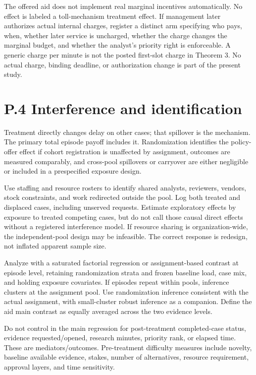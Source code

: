 \documentclass[
  11pt,
]{article}
\begin{document}
The offered aid does not implement real marginal incentives
automatically. No effect is labeled a toll-mechanism treatment effect.
If management later authorizes actual internal charges, register a
distinct arm specifying who pays, when, whether later service is
uncharged, whether the charge changes the marginal budget, and whether
the analyst's priority right is enforceable. A generic charge per minute
is not the posted first-slot charge in Theorem 3. No actual charge,
binding deadline, or authorization change is part of the present study.

\section{P.4 Interference and
identification}\label{p.4-interference-and-identification}

Treatment directly changes delay on other cases; that spillover is the
mechanism. The primary total episode payoff includes it. Randomization
identifies the policy-offer effect if cohort registration is unaffected
by assignment, outcomes are measured comparably, and cross-pool
spillovers or carryover are either negligible or included in a
prespecified exposure design.

Use staffing and resource rosters to identify shared analysts,
reviewers, vendors, stock constraints, and work redirected outside the
pool. Log both treated and displaced cases, including unserved requests.
Estimate exploratory effects by exposure to treated competing cases, but
do not call those causal direct effects without a registered
interference model. If resource sharing is organization-wide, the
independent-pool design may be infeasible. The correct response is
redesign, not inflated apparent sample size.

Analyze with a saturated factorial regression or assignment-based
contrast at episode level, retaining randomization strata and frozen
baseline load, case mix, and holding exposure covariates. If episodes
repeat within pools, inference clusters at the assignment pool. Use
randomization inference consistent with the actual assignment, with
small-cluster robust inference as a companion. Define the aid main
contrast as equally averaged across the two evidence levels.

Do not control in the main regression for post-treatment completed-case
status, evidence requested/opened, research minutes, priority rank, or
elapsed time. These are mediators/outcomes. Pre-treatment difficulty
measures include novelty, baseline available evidence, stakes, number of
alternatives, resource requirement, approval layers, and time
sensitivity.
\end{document}
